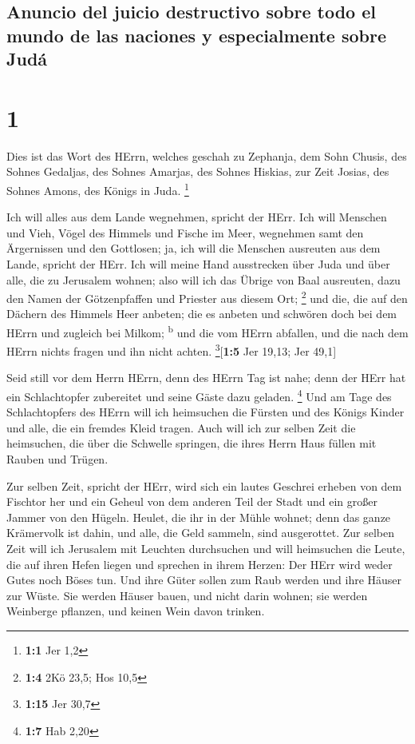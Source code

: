 \hypertarget{anuncio-del-juicio-destructivo-sobre-todo-el-mundo-de-las-naciones-y-especialmente-sobre-juduxe1}{%
\subsection{Anuncio del juicio destructivo sobre todo el mundo de las
naciones y especialmente sobre
Judá}\label{anuncio-del-juicio-destructivo-sobre-todo-el-mundo-de-las-naciones-y-especialmente-sobre-juduxe1}}

\hypertarget{section}{%
\section{1}\label{section}}

 Dies ist das Wort des HErrn, welches geschah zu Zephanja,
dem Sohn Chusis, des Sohnes Gedaljas, des Sohnes Amarjas, des Sohnes
Hiskias, zur Zeit Josias, des Sohnes Amons, des Königs in Juda.
\footnote{\textbf{1:1} Jer 1,2}

 Ich will alles aus dem Lande wegnehmen, spricht der HErr.
 Ich will Menschen und Vieh, Vögel des Himmels und Fische
im Meer, wegnehmen samt den Ärgernissen und den Gottlosen; ja, ich will
die Menschen ausreuten aus dem Lande, spricht der HErr. 
Ich will meine Hand ausstrecken über Juda und über alle, die zu
Jerusalem wohnen; also will ich das Übrige von Baal ausreuten, dazu den
Namen der Götzenpfaffen und Priester aus diesem Ort; \footnote{\textbf{1:4}
  2Kö 23,5; Hos 10,5}  und die, die auf den Dächern des
Himmels Heer anbeten; die es anbeten und schwören doch bei dem HErrn und
zugleich bei Milkom; \textsuperscript{b}  und die vom
HErrn abfallen, und die nach dem HErrn nichts fragen und ihn nicht
achten. \footnote{\textbf{1:15} Jer 30,7}{[}\textbf{1:5} Jer 19,13; Jer
49,1{]}

 Seid still vor dem Herrn HErrn, denn des HErrn Tag ist
nahe; denn der HErr hat ein Schlachtopfer zubereitet und seine Gäste
dazu geladen. \footnote{\textbf{1:7} Hab 2,20}  Und am
Tage des Schlachtopfers des HErrn will ich heimsuchen die Fürsten und
des Königs Kinder und alle, die ein fremdes Kleid tragen. 
Auch will ich zur selben Zeit die heimsuchen, die über die Schwelle
springen, die ihres Herrn Haus füllen mit Rauben und Trügen.

 Zur selben Zeit, spricht der HErr, wird sich ein lautes
Geschrei erheben von dem Fischtor her und ein Geheul von dem anderen
Teil der Stadt und ein großer Jammer von den Hügeln. 
Heulet, die ihr in der Mühle wohnet; denn das ganze Krämervolk ist
dahin, und alle, die Geld sammeln, sind ausgerottet.  Zur
selben Zeit will ich Jerusalem mit Leuchten durchsuchen und will
heimsuchen die Leute, die auf ihren Hefen liegen und sprechen in ihrem
Herzen: Der HErr wird weder Gutes noch Böses tun.  Und
ihre Güter sollen zum Raub werden und ihre Häuser zur Wüste. Sie werden
Häuser bauen, und nicht darin wohnen; sie werden Weinberge pflanzen, und
keinen Wein davon trinken.


